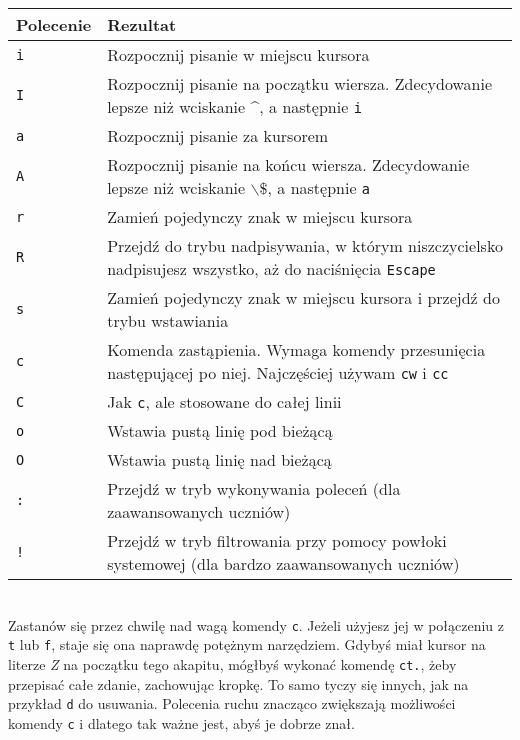 \documentclass[a4paper,12pt]{article}
\begin{document}
\begin{tabular}{ l | p{} }
{\bf Polecenie} & {\bf Rezultat} \\ \hline
{\tt i} & Rozpocznij pisanie w miejscu kursora \\
{\tt I} & Rozpocznij pisanie na początku wiersza. Zdecydowanie lepsze niż wciskanie \^{}, a następnie {\tt i} \\
{\tt a} & Rozpocznij pisanie za kursorem \\
{\tt A} & Rozpocznij pisanie na końcu wiersza. Zdecydowanie lepsze niż wciskanie $\backslash\$$, a następnie {\tt a} \\
{\tt r} & Zamień pojedynczy znak w miejscu kursora \\
{\tt R} & Przejdź do trybu nadpisywania, w którym niszczycielsko nadpisujesz wszystko, aż do naciśnięcia {\tt Escape} \\
{\tt s} & Zamień pojedynczy znak w miejscu kursora i przejdź do trybu wstawiania \\
{\tt c} & Komenda zastąpienia. Wymaga komendy przesunięcia następującej po niej. Najczęściej używam {\tt cw} i {\tt cc} \\
{\tt C} & Jak {\tt c}, ale stosowane do całej linii \\
{\tt o} & Wstawia pustą linię pod bieżącą \\
{\tt O} & Wstawia pustą linię nad bieżącą \\
{\tt :} & Przejdź w tryb wykonywania poleceń (dla zaawansowanych uczniów) \\
{\tt !} & Przejdź w tryb filtrowania przy pomocy powłoki systemowej (dla bardzo zaawansowanych uczniów) \\ \hline
\end{tabular}\\

\noindent
Zastanów się przez chwilę nad wagą komendy {\tt c}. Jeżeli użyjesz jej w połączeniu z {\tt t} lub {\tt f}, staje się ona naprawdę potężnym narzędziem. Gdybyś miał kursor na literze {\it Z} na początku tego akapitu, mógłbyś wykonać komendę {\tt ct.}, żeby przepisać całe zdanie, zachowując kropkę. To samo tyczy się innych, jak na przykład {\tt d} do usuwania. Polecenia ruchu znacząco zwiększają możliwości komendy {\tt c} i dlatego tak ważne jest, abyś je dobrze znał.
\end{document}
